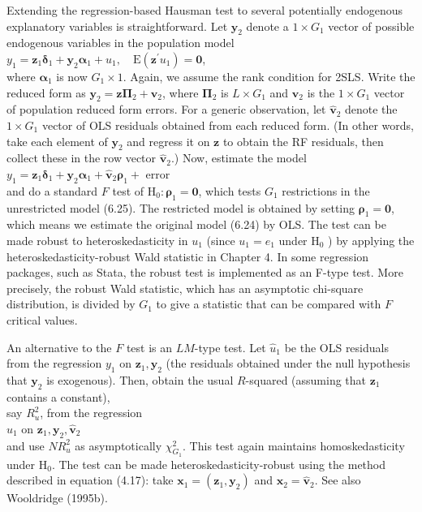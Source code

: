 \documentclass[10pt]{article}
\begin{document}
Extending the regression-based Hausman test to several potentially endogenous explanatory variables is straightforward. Let $\mathbf{y}_{2}$ denote a $1 \times G_{1}$ vector of possible endogenous variables in the population model\\
$y_{1}=\mathbf{z}_{1} \boldsymbol{\delta}_{1}+\mathbf{y}_{2} \boldsymbol{\alpha}_{1}+u_{1}, \quad \mathrm{E}\left(\mathbf{z}^{\prime} u_{1}\right)=\mathbf{0}$,\\
where $\boldsymbol{\alpha}_{1}$ is now $G_{1} \times 1$. Again, we assume the rank condition for 2SLS. Write the reduced form as $\mathbf{y}_{2}=\mathbf{z} \boldsymbol{\Pi}_{2}+\mathbf{v}_{2}$, where $\boldsymbol{\Pi}_{2}$ is $L \times G_{1}$ and $\mathbf{v}_{2}$ is the $1 \times G_{1}$ vector of population reduced form errors. For a generic observation, let $\hat{\mathbf{v}}_{2}$ denote the $1 \times G_{1}$ vector of OLS residuals obtained from each reduced form. (In other words, take each element of $\mathbf{y}_{2}$ and regress it on $\mathbf{z}$ to obtain the RF residuals, then collect these in the row vector $\hat{\mathbf{v}}_{2}$.) Now, estimate the model\\
$y_{1}=\mathbf{z}_{1} \boldsymbol{\delta}_{1}+\mathbf{y}_{2} \boldsymbol{\alpha}_{1}+\hat{\mathbf{v}}_{2} \boldsymbol{\rho}_{1}+$ error\\
and do a standard $F$ test of $\mathrm{H}_{0}: \boldsymbol{\rho}_{1}=\mathbf{0}$, which tests $G_{1}$ restrictions in the unrestricted model (6.25). The restricted model is obtained by setting $\boldsymbol{\rho}_{1}=\mathbf{0}$, which means we estimate the original model (6.24) by OLS. The test can be made robust to heteroskedasticity in $u_{1}$ (since $u_{1}=e_{1}$ under $\mathrm{H}_{0}$ ) by applying the heteroskedasticity-robust Wald statistic in Chapter 4. In some regression packages, such as Stata, the robust test is implemented as an F-type test. More precisely, the robust Wald statistic, which has an asymptotic chi-square distribution, is divided by $G_{1}$ to give a statistic that can be compared with $F$ critical values.

An alternative to the $F$ test is an $L M$-type test. Let $\hat{u}_{1}$ be the OLS residuals from the regression $y_{1}$ on $\mathbf{z}_{1}, \mathbf{y}_{2}$ (the residuals obtained under the null hypothesis that $\mathbf{y}_{2}$ is exogenous). Then, obtain the usual $R$-squared (assuming that $\mathbf{z}_{1}$ contains a constant),\\
say $R_{u}^{2}$, from the regression\\
$\hat{u}_{1}$ on $\mathbf{z}_{1}, \mathbf{y}_{2}, \hat{\mathbf{v}}_{2}$\\
and use $N R_{u}^{2}$ as asymptotically $\chi_{G_{1}}^{2}$. This test again maintains homoskedasticity under $\mathrm{H}_{0}$. The test can be made heteroskedasticity-robust using the method described in equation (4.17): take $\mathbf{x}_{1}=\left(\mathbf{z}_{1}, \mathbf{y}_{2}\right)$ and $\mathbf{x}_{2}=\hat{\mathbf{v}}_{2}$. See also Wooldridge (1995b).
\end{document}
